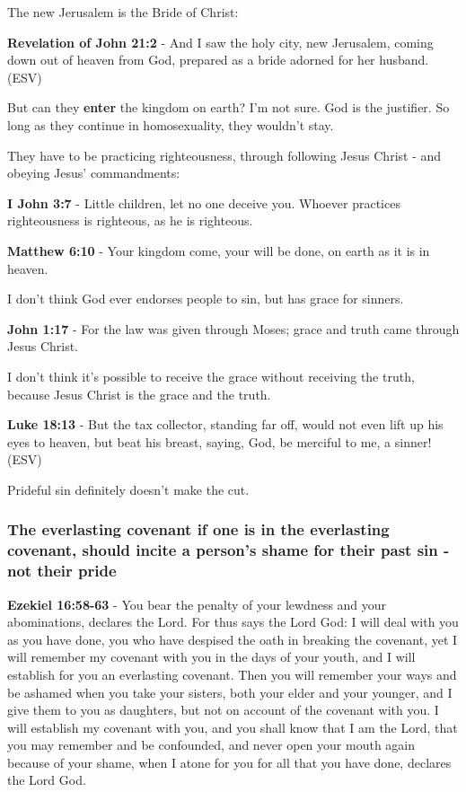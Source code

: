 \documentclass[11pt]{article}
\begin{document}
The new Jerusalem is the Bride of Christ:

\textbf{Revelation of John 21:2} - And I saw the holy city, new Jerusalem, coming down out of heaven from God, prepared as a bride adorned for her husband. (ESV)

But can they \textbf{enter} the kingdom on earth? I'm not sure.
God is the justifier.
So long as they continue in homosexuality, they wouldn't stay.

They have to be practicing righteousness, through following Jesus Christ - and obeying Jesus' commandments:

\textbf{I John 3:7} - Little children, let no one deceive you. Whoever practices righteousness is righteous, as he is righteous.

\textbf{Matthew 6:10} - Your kingdom come, your will be done, on earth as it is in heaven.

I don't think God ever endorses people to sin, but has grace for sinners.

\textbf{John 1:17} - For the law was given through Moses; grace and truth came through Jesus Christ.

I don't think it's possible to receive the grace without receiving the truth, because Jesus Christ is the grace and the truth.

\textbf{Luke 18:13} - But the tax collector, standing far off, would not even lift up his eyes to heaven, but beat his breast, saying, God, be merciful to me, a sinner! (ESV)

Prideful sin definitely doesn't make the cut.

\subsubsection{The everlasting covenant if one is in the everlasting covenant, should incite a person's shame for their past sin - not their pride}
\label{sec:orga79baec}
\textbf{Ezekiel 16:58-63} - You bear the penalty of your lewdness and your abominations, declares the Lord.  For thus says the Lord God: I will deal with you as you have done, you who have despised the oath in breaking the covenant, yet I will remember my covenant with you in the days of your youth, and I will establish for you an everlasting covenant.  Then you will remember your ways and be ashamed when you take your sisters, both your elder and your younger, and I give them to you as daughters, but not on account of the covenant with you.  I will establish my covenant with you, and you shall know that I am the Lord, that you may remember and be confounded, and never open your mouth again because of your shame, when I atone for you for all that you have done, declares the Lord God.
\end{document}
